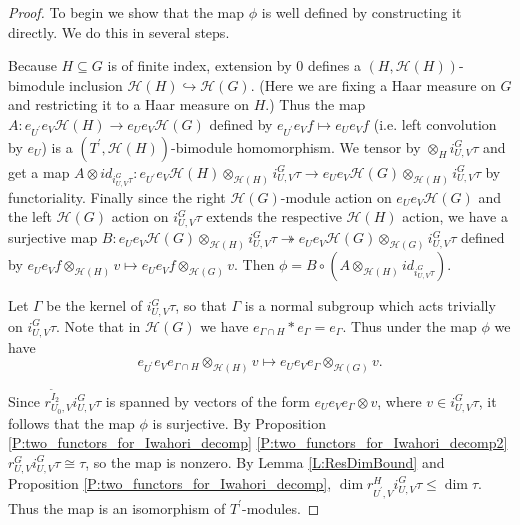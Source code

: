 \documentclass[10pt, letterpaper]{amsart}
\theoremstyle{plain}
\theoremstyle{definition}
\numberwithin{equation}{section}
\newcommand{\It}{\widetilde{I}}
\begin{document}
\begin{proof}

    To begin we show that the map $\phi$ is well defined by constructing it directly. We do this in several steps.

    Because $H\subseteq G$ is of finite index, extension by $0$ defines a $(H,\mathcal{H}(H))$-bimodule inclusion $\mathcal{H}(H)\hookrightarrow \mathcal{H}(G)$. (Here we are fixing a Haar measure on $G$ and restricting it to a Haar measure on $H$.) Thus the map $A:e_{U^{\prime}}e_{V}\mathcal{H}(H)\rightarrow e_{U}e_{V}\mathcal{H}(G)$ defined by $e_{U^{\prime}}e_{V} f\mapsto e_{U}e_{V}f$ (i.e. left convolution by $e_{U}$) is a $(T^{\prime},\mathcal{H}(H))$-bimodule homomorphism. We tensor by $\otimes_{H}i_{U,V}^{G}\tau$ and get a map $A\otimes id_{i_{U,V}^{G}\tau}:e_{U^{\prime}}e_{V}\mathcal{H}(H)\otimes_{\mathcal{H}(H)}i_{U,V}^{G}\tau\rightarrow e_{U}e_{V}\mathcal{H}(G)\otimes_{\mathcal{H}(H)}i_{U,V}^{G}\tau$ by functoriality. Finally since the right $\mathcal{H}(G)$-module action on $e_{U}e_{V}\mathcal{H}(G)$ and the left $\mathcal{H}(G)$ action on $i_{U,V}^{G}\tau$ extends the respective $\mathcal{H}(H)$ action, we have a surjective map $B:e_{U}e_{V}\mathcal{H}(G)\otimes_{\mathcal{H}(H)}i_{U,V}^{G}\tau\twoheadrightarrow e_{U}e_{V}\mathcal{H}(G)\otimes_{\mathcal{H}(G)}i_{U,V}^{G}\tau$ defined by $e_{U}e_{V}f\otimes_{\mathcal{H}(H)} v\mapsto e_{U}e_{V}f\otimes_{\mathcal{H}(G)} v$. Then $\phi=B \circ(A\otimes_{\mathcal{H}(H)} id_{i_{U,V}^{G}\tau})$.

    Let $\Gamma$ be the kernel of $i_{U,V}^{G}\tau$, so that $\Gamma$ is a normal subgroup which acts trivially on $i_{U,V}^{G}\tau$. Note that in $\mathcal{H}(G)$ we have $e_{\Gamma\cap H}*e_{\Gamma}=e_{\Gamma}$. Thus under the map $\phi$ we have
    \begin{equation*}
        e_{U^{\prime}}e_{V}e_{\Gamma\cap H}\otimes_{\mathcal{H}(H)} v\mapsto e_{U}e_{V}e_{\Gamma}\otimes_{\mathcal{H}(G)} v.
    \end{equation*}

    Since $r_{U_{0},V}^{\It_{2}}i_{U,V}^{G}\tau$ is spanned by vectors of the form $e_{U}e_{V}e_{\Gamma}\otimes v$, where $v\in i_{U,V}^{G}\tau$, it follows that the map $\phi$ is surjective. By Proposition \ref{P:two_functors_for_Iwahori_decomp} \eqref{P:two_functors_for_Iwahori_decomp2} $r_{U,V}^{G}i_{U,V}^{G}\tau\cong \tau$, so the map is nonzero. By Lemma \ref{L:ResDimBound} and Proposition \ref{P:two_functors_for_Iwahori_decomp}, $\dim r_{U^{\prime},V}^{H}i_{U,V}^{G}\tau\leq \dim\tau$. Thus the map is an isomorphism of $T^{\prime}$-modules. 

    
\end{proof}
\end{document}
